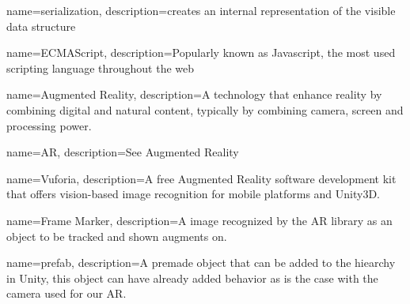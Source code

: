 {
	name=serialization,
	description={creates an internal representation of the visible data 
  				structure}
}

{
	name=ECMAScript,
	description={Popularly known as Javascript, the most used scripting
				language throughout the web}
}

{
	name=Augmented Reality,
	description={A technology that enhance reality by combining digital and
				natural content, typically by combining camera, screen and
				processing power.}
}

{
	name=AR,
	description={See \gls{Augmented Reality}}
}

{
	name=Vuforia,
	description={A free Augmented Reality software development kit that	offers
				vision-based image recognition for mobile platforms	and 
				Unity3D.}
}

{
	name=Frame Marker,
	description={A image recognized by the AR library as an object to be tracked and shown augments on.}
}

{
	name=prefab,
	description={A premade object that can be added to the hiearchy in Unity, this object can have already added behavior as is the case with the camera used for our \gls{AR}.}
}
